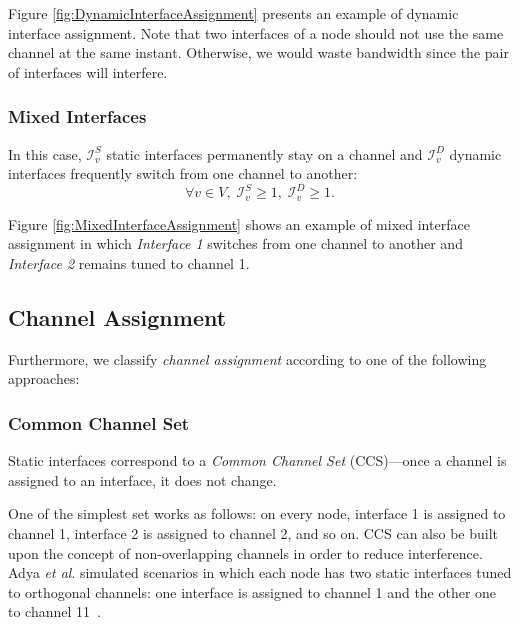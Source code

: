 \documentclass[twoside]{article}
\newcommand{\intf}{\mathcal{I}}
\begin{document}
Figure \ref{fig:DynamicInterfaceAssignment} presents an example of dynamic interface assignment.
Note that two interfaces of a node should not use the same channel at the same instant.
Otherwise, we would waste bandwidth since the pair of interfaces will interfere.




\subsubsection{Mixed Interfaces} 
\label{sec:mixed} 
In this case, $\intf_{v}^S$ static interfaces permanently stay on a channel and $\intf_{v}^D$ dynamic interfaces frequently switch from one channel to another:
\begin{equation}
 \forall v\in V, \; \intf_{v}^S\geq 1, \; \intf_{v}^D\geq 1.
\end{equation}

Figure \ref{fig:MixedInterfaceAssignment} shows an example of mixed interface assignment in which \textit{Interface 1} switches from one channel to another and \textit{Interface 2} remains tuned to channel 1.





\subsection{Channel Assignment}
\label{section:ChannelAssignment}



Furthermore, we classify \textit{channel assignment} according to one of the following approaches:


\subsubsection{Common Channel Set} 

Static interfaces correspond to a \textit{Common Channel Set} (CCS)---once a channel is assigned to an interface, it does not change. 

	One of the simplest set works as follows: on every node,  interface 1 is assigned to channel 1, interface 2 is assigned to channel 2, and so on. 
	CCS can also be built upon the concept of non-overlapping channels in order to reduce interference. 
	Adya \textit{et al}. simulated scenarios in which each node has two static interfaces tuned to orthogonal channels: one interface is assigned to channel 1 and the other one to channel 11~\cite{adya04}. 
\end{document}
